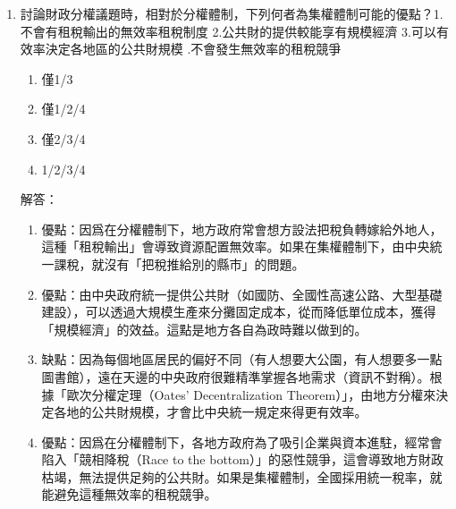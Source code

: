 \documentclass[12pt, a4paper]{article}
\begin{document}
\begin{enumerate}
    \item 討論財政分權議題時，相對於分權體制，下列何者為集權體制可能的優點？1.不會有租稅輸出的無效率租稅制度 2.公共財的提供較能享有規模經濟 3.可以有效率決定各地區的公共財規模 .不會發生無效率的租稅競爭
    \begin{enumerate}[label=\Alph*.]
        \item 僅1/3
        \item 僅1/2/4
        \item 僅2/3/4
        \item 1/2/3/4
    \end{enumerate}
    解答：
    \begin{enumerate}[1.]
        \item 優點：因爲在分權體制下，地方政府常會想方設法把稅負轉嫁給外地人，這種「租稅輸出」會導致資源配置無效率。如果在集權體制下，由中央統一課稅，就沒有「把稅推給別的縣市」的問題。
        \item 優點：由中央政府統一提供公共財（如國防、全國性高速公路、大型基礎建設），可以透過大規模生產來分攤固定成本，從而降低單位成本，獲得「規模經濟」的效益。這點是地方各自為政時難以做到的。
        \item 缺點：因為每個地區居民的偏好不同（有人想要大公園，有人想要多一點圖書館），遠在天邊的中央政府很難精準掌握各地需求（資訊不對稱）。根據「歐次分權定理（Oates' Decentralization Theorem）」，由地方分權來決定各地的公共財規模，才會比中央統一規定來得更有效率。
        \item 優點：因爲在分權體制下，各地方政府為了吸引企業與資本進駐，經常會陷入「競相降稅（Race to the bottom）」的惡性競爭，這會導致地方財政枯竭，無法提供足夠的公共財。如果是集權體制，全國採用統一稅率，就能避免這種無效率的租稅競爭。
    \end{enumerate}


\end{enumerate}
\end{document}
